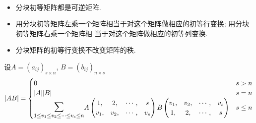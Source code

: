 \begin{Note} \ \\
\begin{itemize}
\item 分块初等矩阵都是可逆矩阵. 
\item 用分块初等矩阵左乘一个矩阵相当于对这个矩阵做相应的初等行变换; 用分块初等矩阵右乘一个矩阵相
当于对这个矩阵做相应的初等列变换.
\item 分块矩阵的初等行变换不改变矩阵的秩. 
\end{itemize}
\end{Note}

\begin{Theorem}
设$A = (a_{ij})_{s \times n}$, $B = (b_{ij})_{n \times s}$
\[
\norm{AB} = \begin{cases}
0 & s > n \\
\norm{A} \norm{B} & s = n \\
\mathlarger{\mathlarger{\mathlarger{\sum}}}\limits_{1 \le v_1 \le v_2 \le \cdots \le v_s \le n} A \begin{pmatrix}
1,   & 2,   & \cdots, & s \\
v_1, & v_2, & \cdots, & v_s
\end{pmatrix} B \begin{pmatrix}
v_1, & v_2, & \cdots, & v_s \\
1,   & 2,   & \cdots, & s
\end{pmatrix} & s \le n \\
\end{cases}
\]
\end{Theorem}